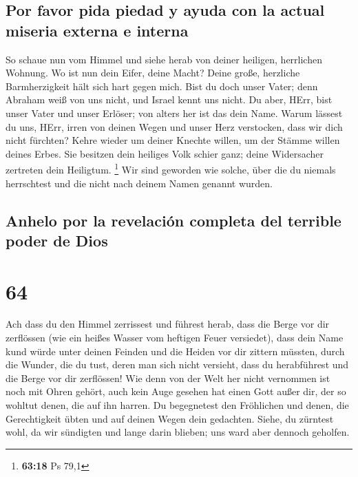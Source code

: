 \hypertarget{por-favor-pida-piedad-y-ayuda-con-la-actual-miseria-externa-e-interna}{%
\subsection{Por favor pida piedad y ayuda con la actual miseria externa
e
interna}\label{por-favor-pida-piedad-y-ayuda-con-la-actual-miseria-externa-e-interna}}

 So schaue nun vom Himmel und siehe herab von deiner
heiligen, herrlichen Wohnung. Wo ist nun dein Eifer, deine Macht? Deine
große, herzliche Barmherzigkeit hält sich hart gegen mich.
 Bist du doch unser Vater; denn Abraham weiß von uns
nicht, und Israel kennt uns nicht. Du aber, HErr, bist unser Vater und
unser Erlöser; von alters her ist das dein Name.  Warum
lässest du uns, HErr, irren von deinen Wegen und unser Herz verstocken,
dass wir dich nicht fürchten? Kehre wieder um deiner Knechte willen, um
der Stämme willen deines Erbes.  Sie besitzen dein
heiliges Volk schier ganz; deine Widersacher zertreten dein Heiligtum.
\footnote{\textbf{63:18} Ps 79,1}  Wir sind geworden wie
solche, über die du niemals herrschtest und die nicht nach deinem Namen
genannt wurden.

\hypertarget{anhelo-por-la-revelaciuxf3n-completa-del-terrible-poder-de-dios}{%
\subsection{Anhelo por la revelación completa del terrible poder de
Dios}\label{anhelo-por-la-revelaciuxf3n-completa-del-terrible-poder-de-dios}}

\hypertarget{section-63}{%
\section{64}\label{section-63}}

 Ach dass du den Himmel zerrissest und führest herab, dass
die Berge vor dir zerflössen (wie ein heißes Wasser vom heftigen Feuer
versiedet), dass dein Name kund würde unter deinen Feinden und die
Heiden vor dir zittern müssten,  durch die Wunder, die du
tust, deren man sich nicht versieht, dass du herabführest und die Berge
vor dir zerflössen!  Wie denn von der Welt her nicht
vernommen ist noch mit Ohren gehört, auch kein Auge gesehen hat einen
Gott außer dir, der so wohltut denen, die auf ihn harren. 
Du begegnetest den Fröhlichen und denen, die Gerechtigkeit übten und auf
deinen Wegen dein gedachten. Siehe, du zürntest wohl, da wir sündigten
und lange darin blieben; uns ward aber dennoch geholfen.


